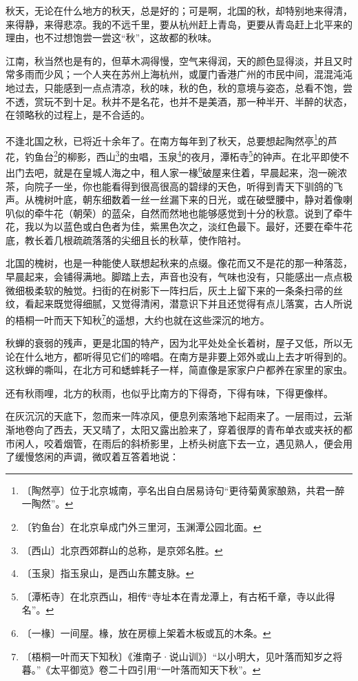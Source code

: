\documentclass[12pt,UTF-8,openany]{ctexbook}
\begin{document}
\begin{large}
    
    秋天，无论在什么地方的秋天，总是好的；可是啊，北国的秋，却特别地来得清，来得静，来得悲凉。我的不远千里，要从杭州赶上青岛，更要从青岛赶上北平来的理由，也不过想饱尝一尝这“秋”，这故都的秋味。
    
    江南，秋当然也是有的，但草木凋得慢，空气来得润，天的颜色显得淡，并且又时常多雨而少风；一个人夹在苏州上海杭州，或厦门香港广州的市民中间，混混沌沌地过去，只能感到一点点清凉，秋的味，秋的色，秋的意境与姿态，总看不饱，尝不透，赏玩不到十足。秋并不是名花，也并不是美酒，那一种半开、半醉的状态，在领略秋的过程上，是不合适的。
    
    不逢北国之秋，已将近十余年了。在南方每年到了秋天，总要想起陶然亭\footnote{〔陶然亭〕位于北京城南，亭名出自白居易诗句“更待菊黄家酿熟，共君一醉一陶然”。}的芦花，钓鱼台\footnote{〔钓鱼台〕在北京阜成门外三里河，玉渊潭公园北面。}的柳影，西山\footnote{〔西山〕北京西郊群山的总称，是京郊名胜。}的虫唱，玉泉\footnote{〔玉泉〕指玉泉山，是西山东麓支脉。}的夜月，潭柘寺\footnote{〔潭柘寺〕在北京西山，相传“寺址本在青龙潭上，有古柘千章，寺以此得名”。}的钟声。在北平即使不出门去吧，就是在皇城人海之中，租人家一椽\footnote{〔一椽〕一间屋。椽，放在房檩上架着木板或瓦的木条。}破屋来住着，早晨起来，泡一碗浓茶，向院子一坐，你也能看得到很高很高的碧绿的天色，听得到青天下驯鸽的飞声。从槐树叶底，朝东细数着一丝一丝漏下来的日光，或在破壁腰中，静对着像喇叭似的牵牛花（朝荣）的蓝朵，自然而然地也能够感觉到十分的秋意。说到了牵牛花，我以为以蓝色或白色者为佳，紫黑色次之，淡红色最下。最好，还要在牵牛花底，教长着几根疏疏落落的尖细且长的秋草，使作陪衬。
    
    北国的槐树，也是一种能使人联想起秋来的点缀。像花而又不是花的那一种落蕊，早晨起来，会铺得满地。脚踏上去，声音也没有，气味也没有，只能感出一点点极微细极柔软的触觉。扫街的在树影下一阵扫后，灰土上留下来的一条条扫帚的丝纹，看起来既觉得细腻，又觉得清闲，潜意识下并且还觉得有点儿落寞，古人所说的梧桐一叶而天下知秋\footnote{〔梧桐一叶而天下知秋〕《淮南子·说山训》〕“以小明大，见叶落而知岁之将暮。”《太平御览》卷二十四引用“一叶落而知天下秋”。}的遥想，大约也就在这些深沉的地方。
    
    秋蝉的衰弱的残声，更是北国的特产，因为北平处处全长着树，屋子又低，所以无论在什么地方，都听得见它们的啼唱。在南方是非要上郊外或山上去才听得到的。这秋蝉的嘶叫，在北方可和蟋蟀耗子一样，简直像是家家户户都养在家里的家虫。
    
    还有秋雨哩，北方的秋雨，也似乎比南方的下得奇，下得有味，下得更像样。
    
    在灰沉沉的天底下，忽而来一阵凉风，便息列索落地下起雨来了。一层雨过，云渐渐地卷向了西去，天又晴了，太阳又露出脸来了，穿着很厚的青布单衣或夹袄的都市闲人，咬着烟管，在雨后的斜桥影里，上桥头树底下去一立，遇见熟人，便会用了缓慢悠闲的声调，微叹着互答着地说：
    

\end{large}
\end{document}
